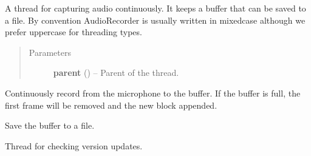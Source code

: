 \documentclass[letterpaper,10pt,english]{sphinxmanual}
\begin{document}

\begin{fulllineitems}
\label{api:wos.AudioRecorder}
A thread for capturing audio continuously.
It keeps a buffer that can be saved to a file.
By convention AudioRecorder is usually written in mixedcase although we
prefer uppercase for threading types.
\begin{quote}\begin{description}
\item[{Parameters}] \leavevmode
\textbf{parent} () -- Parent of the thread.

\end{description}\end{quote}

\begin{fulllineitems}
\label{api:wos.AudioRecorder.run}
Continuously record from the microphone to the buffer.
If the buffer is full, the first frame will be removed and
the new block appended.

\end{fulllineitems}


\begin{fulllineitems}
\label{api:wos.AudioRecorder.save}
Save the buffer to a file.

\end{fulllineitems}


\end{fulllineitems}


\begin{fulllineitems}
\label{api:wos.CHECK_UPDATE}
Thread for checking version updates.

\end{fulllineitems}

\end{document}
